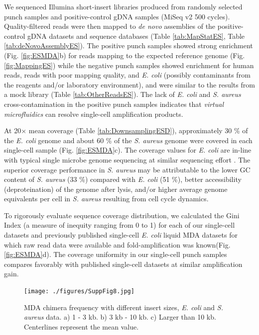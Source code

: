 We sequenced Illumina short-insert libraries produced from randomly selected punch samples and positive-control gDNA samples (MiSeq v2 500 cycles). Quality-filtered reads were then mapped to \textit{de novo} assemblies of the positive-control gDNA datasets and sequence databases (Table \ref{tab:MapStatES}, Table \ref{tab:deNovoAssemblyES}). The positive punch samples showed strong enrichment (Fig. \ref{fig:ESMDA}b) for reads mapping to the expected reference genome (Fig. \ref{fig:MappingES}) while the negative punch samples showed enrichment for human reads, reads with poor mapping quality, and \textit{E. coli} (possibly contaminants from the reagents and\slash or laboratory environment), and were similar to the results from a mock library (Table \ref{tab:OtherReadsES}). The lack of \textit{E. coli}  and \textit{S. aureus} cross-contamination in the positive punch samples indicates that \textit{virtual microfluidics} can resolve single-cell amplification products.

At 20$\times$ mean coverage (Table \ref{tab:DownsamplingESD}), approximately 30 \% of the \textit{E. coli}  genome and about 60 \% of the \textit{S. aureus}  genome were covered in each single-cell sample (Fig. \ref{fig:ESMDA}c). The coverage values for \textit{E. coli}  are in-line with typical single microbe genome sequencing at similar sequencing effort \cite{Woyke:2011eg,deBourcy:2014ji}. The superior coverage performance in \textit{S. aureus}  may be attributable to the lower GC content of \textit{S. aureus}  (33 \%) compared with \textit{E. coli}  (51 \%), better accessibility (deproteination) of the genome after lysis, and\slash or higher average genome equivalents per cell in \textit{S. aureus} resulting from cell cycle dynamics.

To rigorously evaluate sequence coverage distribution, we calculated the Gini Index (a measure of inequity ranging from 0 to 1) for each of our single-cell datasets and previously published single-cell \textit{E. coli} liquid MDA datasets for which raw read data were available and fold-amplification was known(Fig. \ref{fig:ESMDA}d). The coverage uniformity in our single-cell punch samples compares favorably with published single-cell datasets at similar amplification gain.

\begin{figure}
\centering
\texttt{[image: ./figures/SuppFig8.jpg]}
\caption[MDA chimera frequency with different insert sizes, \textit{E. coli} and \textit{S. aureus} data]{MDA chimera frequency with different insert sizes, \textit{E. coli} and \textit{S. aureus} data. a) 1 - 3 kb. b) 3 kb - 10 kb. c) Larger than 10 kb. Centerlines represent the mean value.}
\label{fig:Chimera10k}
\end{figure}

